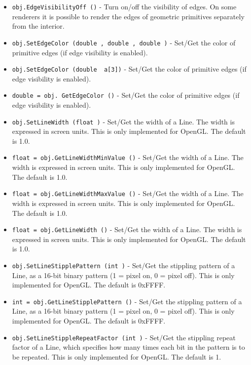 \begin{itemize}
\item  \verb|obj.EdgeVisibilityOff ()| -  Turn on/off the visibility of edges. On some renderers it is
 possible to render the edges of geometric primitives separately
 from the interior.

\item  \verb|obj.SetEdgeColor (double , double , double )| -  Set/Get the color of primitive edges (if edge visibility is enabled).

\item  \verb|obj.SetEdgeColor (double  a[3])| -  Set/Get the color of primitive edges (if edge visibility is enabled).

\item  \verb|double = obj. GetEdgeColor ()| -  Set/Get the color of primitive edges (if edge visibility is enabled).

\item  \verb|obj.SetLineWidth (float )| -  Set/Get the width of a Line. The width is expressed in screen units.
 This is only implemented for OpenGL. The default is 1.0.

\item  \verb|float = obj.GetLineWidthMinValue ()| -  Set/Get the width of a Line. The width is expressed in screen units.
 This is only implemented for OpenGL. The default is 1.0.

\item  \verb|float = obj.GetLineWidthMaxValue ()| -  Set/Get the width of a Line. The width is expressed in screen units.
 This is only implemented for OpenGL. The default is 1.0.

\item  \verb|float = obj.GetLineWidth ()| -  Set/Get the width of a Line. The width is expressed in screen units.
 This is only implemented for OpenGL. The default is 1.0.

\item  \verb|obj.SetLineStipplePattern (int )| -  Set/Get the stippling pattern of a Line, as a 16-bit binary pattern 
 (1 = pixel on, 0 = pixel off).
 This is only implemented for OpenGL. The default is 0xFFFF.

\item  \verb|int = obj.GetLineStipplePattern ()| -  Set/Get the stippling pattern of a Line, as a 16-bit binary pattern 
 (1 = pixel on, 0 = pixel off).
 This is only implemented for OpenGL. The default is 0xFFFF.

\item  \verb|obj.SetLineStippleRepeatFactor (int )| -  Set/Get the stippling repeat factor of a Line, which specifies how
 many times each bit in the pattern is to be repeated.
 This is only implemented for OpenGL. The default is 1.


\end{itemize}
